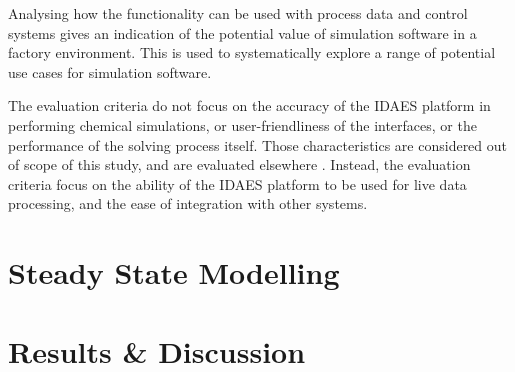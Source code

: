 \documentclass[12pt]{article}
\begin{document}
Analysing how the functionality can be used with process data and control systems gives an indication of the potential value of simulation software in a factory environment. This is used to systematically explore a range of potential use cases for simulation software.

The evaluation criteria do not focus on the accuracy of the IDAES platform in performing chemical simulations, or user-friendliness of the interfaces, or the performance of the solving process itself. Those characteristics are considered out of scope of this study, and are evaluated elsewhere \cite{hart2011pyomo} \cite{myhre2022investigation}. Instead, the evaluation criteria focus on the ability of the IDAES platform to be used for live data processing, and the ease of integration with other systems.









\section{Steady State Modelling}

\section{Results \& Discussion}

\end{document}
